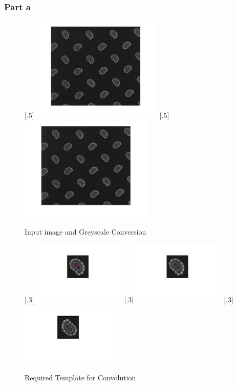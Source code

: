 \documentclass[a4paper]{article}
\begin{document}
	\subsubsection{Part a}
	\begin{figure}[H]
		\centering
		[.5\linewidth]{\includegraphics[height=5cm]{Results/Q3/a/qaInput.jpg}}%
		[.5\linewidth]{\includegraphics[height=5cm]{Results/Q3/a/qaInputGrey.jpg}}%
		\caption{Input image and Greyscale Conversion}
		\label{fig:}
	\end{figure}
	\begin{figure}[H]
		\centering
		[.3\linewidth]{\includegraphics[height=3cm]{Results/Q3/a/qaTemplate.jpg}}%
		[.3\linewidth]{\includegraphics[height=3cm]{Results/Q3/a/qaTemplateGrey.jpg}}%
		[.3\linewidth]{\includegraphics[height=3cm]{Results/Q3/a/qaTemplateGreyRot.jpg}}%
		\caption{Required Template for Convolution}
		\label{fig:}
	\end{figure}
\end{document}
